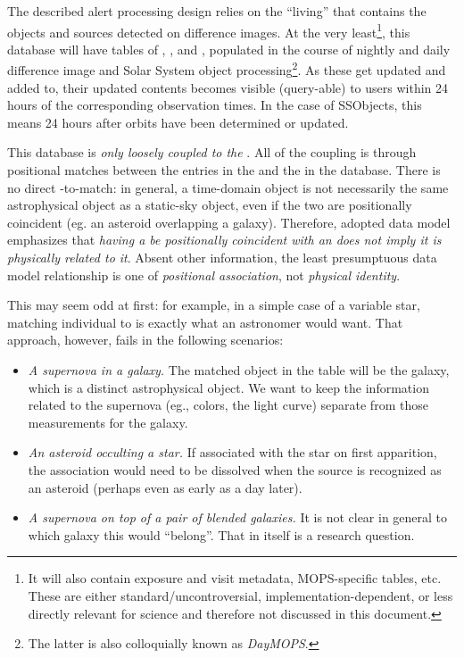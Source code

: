 \documentclass[SE,lsstdraft,toc]{lsstdoc}
\begin{document}
The described alert processing design relies on the ``living'' \DB that contains the objects and sources detected on difference images. At the very least\footnote{It will also contain exposure and visit metadata, MOPS-specific tables, etc. These are either standard/uncontroversial, implementation-dependent, or less directly relevant for science and therefore not discussed in this document.}, this database will have tables of \DIASources, \DIAObjects, and \SSObjects, populated in the course of nightly and daily difference image and Solar System object processing\footnote{The latter is also colloquially known as \emph{DayMOPS}.}. As these get updated and added to, their updated contents becomes visible (query-able) to users within 24 hours of the corresponding observation times. In the case of SSObjects, this means 24 hours after orbits have been determined or updated.


This database is \emph{only loosely coupled to the \DR}. All of the coupling is through positional matches between the \DIAObjects entries in the \DB and the \Objects in the \DR database. There is no direct \DIASource-to-\Object match:
in general, a time-domain object is not necessarily the same astrophysical object as a static-sky object, even if the two are
positionally coincident (eg. an asteroid overlapping a galaxy).
Therefore, adopted data model emphasizes that \emph{having a \DIASource be positionally coincident with an \Object does not imply it is physically related to it}. Absent other information, the least presumptuous data model relationship is one of \emph{positional association}, not \emph{physical identity}.

This may seem odd at first: for example, in a simple case of a variable star, matching individual \DIASources to \Objects is exactly what an astronomer would want. That approach, however, fails in the following scenarios:
\begin{itemize}
    \item \emph{A supernova in a galaxy.} The matched object in the \Object table will be the galaxy, which is a distinct astrophysical object. We want to keep the information related to the supernova (eg., colors, the light curve) separate from those measurements for the galaxy.
    \item \emph{An asteroid occulting a star.} If associated with the star on first apparition, the association would need to be dissolved when the source is recognized as an asteroid (perhaps even as early as a day later).
    \item \emph{A supernova on top of a pair of blended galaxies.} It is not clear in general to which galaxy this \DIASource would ``belong''. That in itself is a research question.
\end{itemize}
\end{document}
